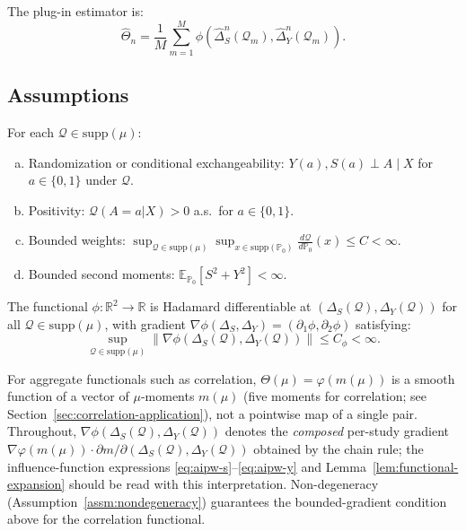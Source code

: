 The plug-in estimator is:
\begin{equation}
\hat{\Theta}_n = \frac{1}{M} \sum_{m=1}^M \phi(\hat{\Delta}_S^n(\mathcal{Q}_m), \hat{\Delta}_Y^n(\mathcal{Q}_m)).
\end{equation}

\subsection{Assumptions}

\begin{assumption}
\label{assm:treatment-effects}
For each $\mathcal{Q} \in \text{supp}(\mu)$:
\begin{enumerate}[(a)]
\item Randomization or conditional exchangeability: $Y(a), S(a) \perp A \mid X$ for $a \in \{0,1\}$ under $\mathcal{Q}$.
\item Positivity: $\mathcal{Q}(A=a|X) > 0$ a.s.\ for $a \in \{0,1\}$.
\item Bounded weights: $\sup_{\mathcal{Q} \in \text{supp}(\mu)} \sup_{x \in \text{supp}(\mathbb{P}_0)} \frac{d\mathcal{Q}}{d\mathbb{P}_0}(x) \leq C < \infty$.
\item Bounded second moments: $\mathbb{E}_{\mathbb{P}_0}[S^2 + Y^2] < \infty$.
\end{enumerate}
\end{assumption}

\begin{assumption}
\label{assm:functional}
The functional $\phi: \mathbb{R}^2 \to \mathbb{R}$ is Hadamard differentiable at $(\Delta_S(\mathcal{Q}), \Delta_Y(\mathcal{Q}))$ for all $\mathcal{Q} \in \text{supp}(\mu)$, with gradient $\nabla\phi(\Delta_S, \Delta_Y) = (\partial_1 \phi, \partial_2 \phi)$ satisfying:
\begin{equation}
\sup_{\mathcal{Q} \in \text{supp}(\mu)} \|\nabla\phi(\Delta_S(\mathcal{Q}), \Delta_Y(\mathcal{Q}))\| \leq C_\phi < \infty.
\end{equation}
\end{assumption}

\begin{remark}
\label{rem:aggregate-gradient}
For aggregate functionals such as correlation, $\Theta(\mu) = \varphi(m(\mu))$ is a smooth function of a vector of $\mu$-moments $m(\mu)$ (five moments for correlation; see Section~\ref{sec:correlation-application}), not a pointwise map of a single pair. Throughout, $\nabla\phi(\Delta_S(\mathcal{Q}), \Delta_Y(\mathcal{Q}))$ denotes the \emph{composed} per-study gradient $\nabla\varphi(m(\mu)) \cdot \partial m/\partial(\Delta_S(\mathcal{Q}), \Delta_Y(\mathcal{Q}))$ obtained by the chain rule; the influence-function expressions \eqref{eq:aipw-s}--\eqref{eq:aipw-y} and Lemma~\ref{lem:functional-expansion} should be read with this interpretation. Non-degeneracy (Assumption~\ref{assm:nondegeneracy}) guarantees the bounded-gradient condition above for the correlation functional.
\end{remark}

